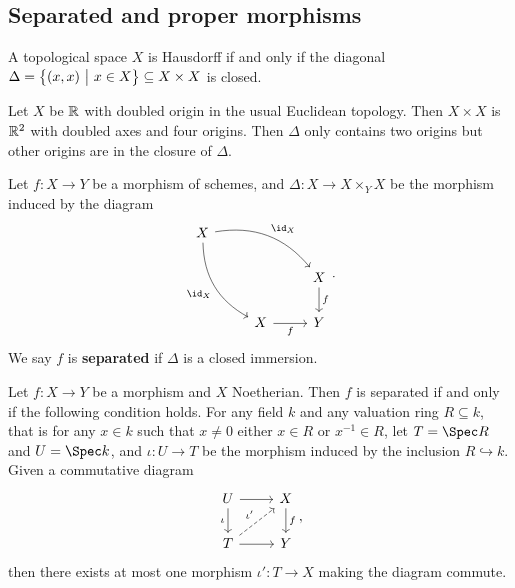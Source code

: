 \pagebreak

\subsection{Separated and proper morphisms}

\begin{remark*}
A topological space $ X $ is Hausdorff if and only if the diagonal $ \Delta = \cbr{\br{x, x} \st x \in X} \subseteq X \times X $ is closed.
\end{remark*}

\begin{example*}
Let $ X $ be $ \mathbb{R} $ with doubled origin in the usual Euclidean topology. Then $ X \times X $ is $ \mathbb{R}^2 $ with doubled axes and four origins. Then $ \Delta $ only contains two origins but other origins are in the closure of $ \Delta $.
\end{example*}

\begin{definition*}
Let $ f : X \to Y $ be a morphism of schemes, and $ \Delta : X \to X \times_Y X $ be the morphism induced by the diagram
$$
\begin{tikzcd}
X \arrow[bend left=30]{drr}{\id_X} \arrow[bend right=30]{ddr}[swap]{\id_X} & & \\
& & X \arrow{d}{f} \\
& X \arrow{r}[swap]{f} & Y
\end{tikzcd}.
$$
We say $ f $ is \textbf{separated} if $ \Delta $ is a closed immersion.
\end{definition*}

\begin{theorem}
Let $ f : X \to Y $ be a morphism and $ X $ Noetherian. Then $ f $ is separated if and only if the following condition holds. For any field $ k $ and any valuation ring $ R \subseteq k $, that is for any $ x \in k $ such that $ x \ne 0 $ either $ x \in R $ or $ x^{-1} \in R $, let $ T = \Spec R $ and $ U = \Spec k $, and $ \iota : U \to T $ be the morphism induced by the inclusion $ R \hookrightarrow k $. Given a commutative diagram
$$
\begin{tikzcd}
U \arrow{r} \arrow{d}[swap]{\iota} & X \arrow{d}{f} \\
T \arrow[dashed]{ur}{\iota'} \arrow{r} & Y
\end{tikzcd},
$$
then there exists at most one morphism $ \iota' : T \to X $ making the diagram commute.
\end{theorem}

